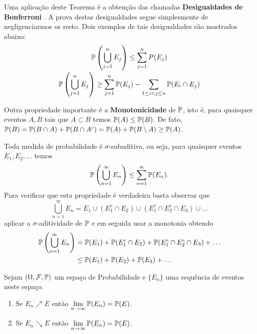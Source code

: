 Uma aplicação deste Teorema é a obtenção das
chamadas {\bf Desigualdades de Bonferroni} .
A prova destas desigualdades segue simplesmente de negligenciarmos 
os resto. Dois exemplos de tais desigualdades são mostrados
abaixo:
\[ 
\begin{array}{c}
	\displaystyle
	\P \left( \bigcup_{j=1}^{n} E_j \right) 
	\leq 
	\sum_{j=1}^n P(E_j)
	\\[0.5cm]
	\displaystyle
	\P \left( \bigcup_{j=1}^{n} E_j \right) 
	\geq
	\sum_{j=1}^n \P(E_j) - \sum_{1\leq i<j\leq n} \P(E_i\cap E_j)	
\end{array}
\]

Outra propriedade importante é a {\bf Monotonicidade} de $\P$, isto é, 
para quaisquer eventos $A,B$ tais que $A\subset B$ temos 
$\P(A)\leq \P(B)$. De fato, 
$\P(B)=\P(B\cap A)+\P(B\cap A^c)= \P(A)+\P(B\setminus A)\geq \P(A)$.

Toda medida de probabilidade é $\sigma$-subaditiva, ou seja, 
para quaisquer eventos $E_1,E_2,\ldots$ temos 
	\[
		\P\left( \bigcup_{n=1}^{\infty} E_n\right)
		\leq 
		\sum_{n=1}^{\infty} \P(E_n).
	\]
Para verificar que esta propriedade é verdadeira basta observar que 
\[
	\bigcup_{n=1}^{\infty} E_n = E_1 \cup (E_1^c\cap E_2) \cup (E_1^c\cap E_2^c\cap E_3) \cup \ldots
\]
aplicar a $\sigma$-aditividade de $\P$ e em seguida usar a monotonia
obtendo
	\begin{align*}
	\P\left( \bigcup_{n=1}^{\infty} E_n\right)
	&=
	\P(E_1)+\P(E_1^c\cap E_2) + \P(E_1^c\cap E_2^c\cap E_3) +\ldots
	\\
	&\leq
	\P(E_1) + \P(E_2) + \P(E_3) +\ldots
	\end{align*}
	
\begin{teorema}
	Sejam $(\Omega,\F,\P)$ um espaço de Probabilidade e
	$\{E_n\}$ uma sequência de eventos neste espaço.
	\begin{enumerate}
		\item
		Se $E_n\nearrow E$ então 
		$\displaystyle\lim_{n\to\infty}\P(E_n)=\P(E)$.
		\item 
		Se $E_n\searrow E$ então 
		$\displaystyle\lim_{n\to\infty}\P(E_n)=\P(E)$.		
	\end{enumerate}
\end{teorema}

